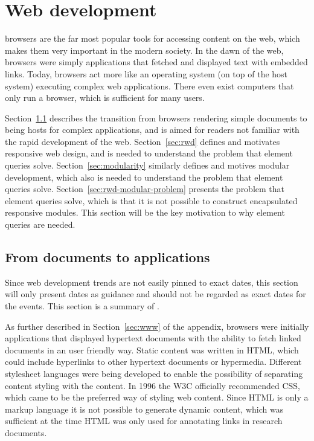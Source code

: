 \documentclass[a4paper,11pt]{kth-mag}
\begin{document}
    \section{Web development}\label{sec:web-dev}
      \Glspl{browser} are the far most popular tools for accessing content on the \gls{web}, which makes them very important in the modern society.
      In the dawn of the \gls{web}, \glspl{browser} were simply applications that fetched and displayed text with embedded links.
      Today, \glspl{browser} act more like an operating system (on top of the host system) executing complex \gls{web} applications.
      There even exist computers that only run a \gls{browser}, which is sufficient for many users.
      
      Section~\ref{sec:doc-to-app} describes the transition from \glspl{browser} rendering simple \glspl{document} to being hosts for complex applications, and is aimed for readers not familiar with the rapid development of the \gls{web}.
      Section~\ref{sec:rwd} defines and motivates \gls{responsive} \gls{web} design, and is needed to understand the problem that element queries solve.
      Section~\ref{sec:modularity} similarly defines and motives modular development, which also is needed to understand the problem that element queries solve.
      Section~\ref{sec:rwd-modular-problem} presents the problem that element queries solve, which is that it is not possible to construct \gls{encapsulated} \gls{responsive} modules.
      This section will be the key motivation to why element queries are needed.

      \subsection{From documents to applications}\label{sec:doc-to-app}
        Since \gls{web} development trends are not easily pinned to exact dates, this section will only present dates as guidance and should not be regarded as exact dates for the events.
        This section is a summary of .

        As further described in Section~\ref{sec:www} of the appendix, \glspl{browser} were initially applications that displayed \gls{hypertext} \glspl{document} with the ability to fetch linked \glspl{document} in an user friendly way.
        Static content was written in \gls{HTML}, which could include hyperlinks to other \gls{hypertext} \glspl{document} or hypermedia.
        Different stylesheet languages were being developed to enable the possibility of separating content styling with the content.
        In 1996 the \gls{W3C} officially recommended \gls{CSS}, which came to be the preferred way of styling \gls{web} content.
        Since \gls{HTML} is only a markup language it is not possible to generate dynamic content, which was sufficient at the time \gls{HTML} was only used for annotating links in research \glspl{document}.
\end{document}
